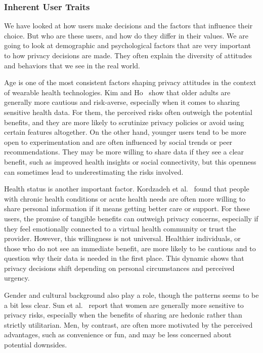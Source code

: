 	\subsubsection{Inherent User Traits}

	We have looked at how users make decisions and the factors that influence their choice. But who are these users, and how do they differ in their values. We are going to look at demographic and psychological factors that are very important to how privacy decisions are made. They often explain the diversity of attitudes and behaviors that we see in the real world.

	Age is one of the most consistent factors shaping privacy attitudes in the context of wearable health technologies. Kim and Ho~\cite{Kim2021} show that older adults are generally more cautious and risk-averse, especially when it comes to sharing sensitive health data. For them, the perceived risks often outweigh the potential benefits, and they are more likely to scrutinize privacy policies or avoid using certain features altogether. On the other hand, younger users tend to be more open to experimentation and are often influenced by social trends or peer recommendations. They may be more willing to share data if they see a clear benefit, such as improved health insights or social connectivity, but this openness can sometimes lead to underestimating the risks involved.

	Health status is another important factor. Kordzadeh et al.~\cite{Kordzadeh2016} found that people with chronic health conditions or acute health needs are often more willing to share personal information if it means getting better care or support. For these users, the promise of tangible benefits can outweigh privacy concerns, especially if they feel emotionally connected to a virtual health community or trust the provider. However, this willingness is not universal. Healthier individuals, or those who do not see an immediate benefit, are more likely to be cautious and to question why their data is needed in the first place. This dynamic shows that privacy decisions shift depending on personal circumstances and perceived urgency.

	Gender and cultural background also play a role, though the patterns seems to be a bit less clear. Sun et al.~\cite{Sun2015} report that women are generally more sensitive to privacy risks, especially when the benefits of sharing are hedonic rather than strictly utilitarian. Men, by contrast, are often more motivated by the perceived advantages, such as convenience or fun, and may be less concerned about potential downsides. 

